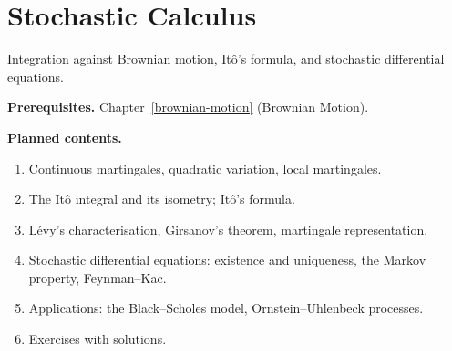 \chapter{Stochastic Calculus}\label{stochastic-calculus}

Integration against Brownian motion, It\^o's formula, and stochastic differential equations.

\noindent\textbf{Prerequisites.} Chapter~\ref{brownian-motion} (Brownian Motion).

\noindent\textbf{Planned contents.}
\begin{enumerate}
\item Continuous martingales, quadratic variation, local martingales.
\item The It\^o integral and its isometry; It\^o's formula.
\item L\'evy's characterisation, Girsanov's theorem, martingale representation.
\item Stochastic differential equations: existence and uniqueness, the Markov property, Feynman--Kac.
\item Applications: the Black--Scholes model, Ornstein--Uhlenbeck processes.
\item Exercises with solutions.
\end{enumerate}

